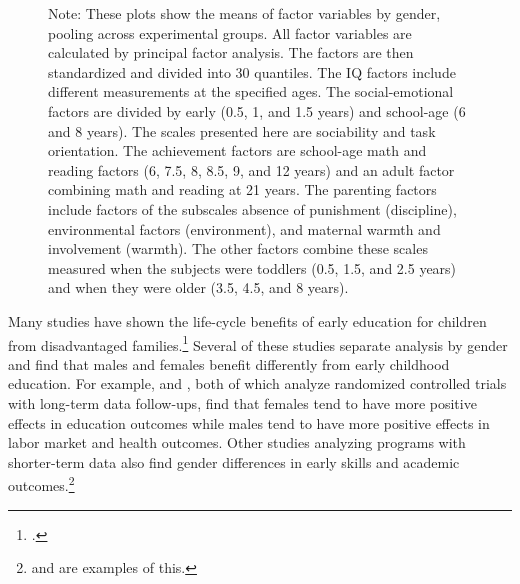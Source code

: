 \begin{figure}
Note: These plots show the means of factor variables by gender, pooling across experimental groups. All factor variables are calculated by principal factor analysis. The factors are then standardized and divided into 30 quantiles. The IQ factors include different measurements at the specified ages. The social-emotional factors are divided by early (0.5, 1, and 1.5 years) and school-age (6 and 8 years). The scales presented here are sociability and task orientation. The achievement factors are school-age math and reading factors (6, 7.5, 8, 8.5, 9, and 12 years) and an adult factor combining math and reading at 21 years. The parenting factors include factors of the subscales absence of punishment (discipline), environmental factors (environment), and maternal warmth and involvement (warmth). The other factors combine these scales measured when the subjects were toddlers (0.5, 1.5, and 2.5 years) and when they were older (3.5, 4.5, and 8 years).
\end{figure}

Many studies have shown the life-cycle benefits of early education for children from disadvantaged families.\footnote{\citet{Elango_Hojman_etal_2016_Early-Edu}.} Several of these studies separate analysis by gender and find that males and females benefit differently from early childhood education. For example, \citet{Heckman_Moon_etal_2010_QE} and \citet{Garcia_etal_2016_Comp_CBA_Unpublished}, both of which analyze randomized controlled trials with long-term data follow-ups, find that females tend to have more positive effects in education outcomes while males tend to have more positive effects in labor market and health outcomes. Other studies analyzing programs with shorter-term data also find gender differences in early skills and academic outcomes.\footnote{\citet{Deming_2009_AEJAE} and \citet{Ou_Reynolds_2010_Mechanisms_CYSR} are examples of this.} 

